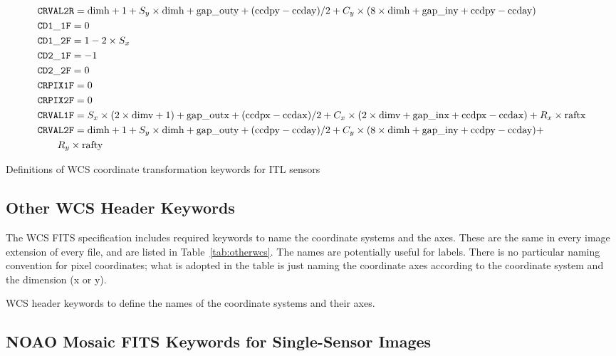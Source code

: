 \documentclass{article}[12pt]
\begin{document}
\begin{table}
\begin{align*}
& {\tt CRVAL2R} = {\rm dimh} + 1 + S_y \times {\rm dimh} + {\rm gap\_outy} + ({\rm ccdpy} - {\rm ccday})/2 + C_y \times ( 8 \times {\rm dimh} + {\rm gap\_iny} + {\rm ccdpy} - {\rm ccday}) \\
& {\tt CD1\_1F} = 0 \\
& {\tt CD1\_2F} = 1 - 2 \times S_x \\
& {\tt CD2\_1F} = -1 \\
& {\tt CD2\_2F} = 0 \\
& {\tt CRPIX1F} = 0 \\
& {\tt CRPIX2F} = 0 \\
& {\tt CRVAL1F} = S_x \times(2 \times {\rm dimv} + 1) + {\rm gap\_outx} + ({\rm ccdpx} - {\rm ccdax})/2 + C_x \times (2 \times {\rm dimv} + {\rm gap\_inx} + {\rm ccdpx} - {\rm ccdax}) + R_x \times {\rm raftx} \\
& {\tt CRVAL2F} = {\rm dimh} + 1 + S_y \times {\rm dimh} + {\rm gap\_outy} + ({\rm ccdpy} - {\rm ccday})/2 +  C_y \times ( 8 \times {\rm dimh} + {\rm gap\_iny} + {\rm ccdpy} - {\rm ccday}) + \\  &\qquad {} R_y \times {\rm rafty} \\
\end{align*}
\caption{Definitions of WCS coordinate transformation keywords for ITL sensors\label{tab:itlwcs}}
\end{table}

\subsection{Other WCS Header Keywords \label{sec:coords_ifl}}

The WCS FITS specification includes required keywords to name the coordinate systems and the axes.  These are the same in every image extension of every file, and are listed in Table~\ref{tab:otherwcs}.  The names are potentially useful for labels.  There is no particular naming convention for pixel coordinates; what is adopted in the table is just naming the coordinate axes according to the coordinate system and the dimension (x or y).

\begin{table}
\begin{alltt}

\end{alltt}
\caption{WCS header keywords to define the names of the coordinate systems and their axes.\label{tab:otherwcs}}
\end{table}

\subsection{NOAO Mosaic FITS Keywords for Single-Sensor Images\label{sec:mosaic}}
\end{document}
